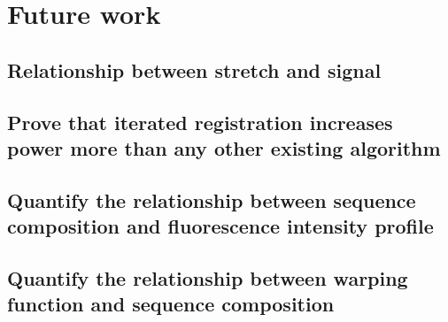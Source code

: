 \section{Future work}

\subsection{Relationship between stretch and signal}

\subsection{Prove that iterated registration increases power more than any other existing algorithm}

\subsection{Quantify the relationship between sequence composition and fluorescence intensity profile}

\subsection{Quantify the relationship between warping function and sequence composition}


